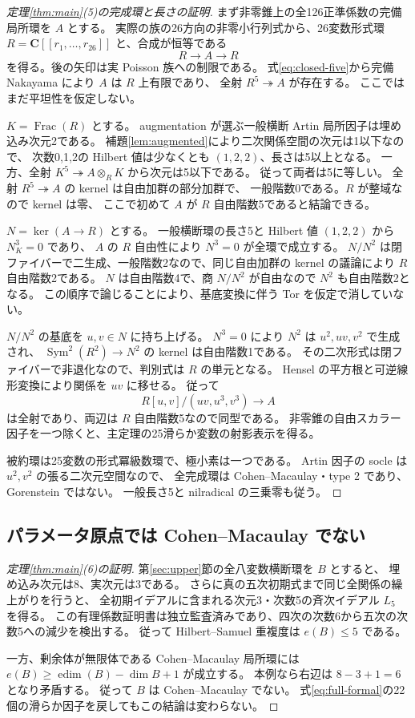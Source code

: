 \documentclass[11pt,a4paper]{ltjsarticle}
\newcommand{\CC}{\mathbf C}
\newcommand{\Sym}{\operatorname{Sym}}
\theoremstyle{remark}
\begin{document}
\begin{proof}[定理\ref{thm:main}(5)の完成環と長さの証明]
まず非零錐上の全126正準係数の完備局所環を $A$ とする。
実際の族の26方向の非零小行列式から、26変数形式環
$R=\CC[[r_1,\ldots,r_{26}]]$ と、合成が恒等である
\[
 R\longrightarrow A\longrightarrow R
\]
を得る。後の矢印は実 Poisson 族への制限である。
式\eqref{eq:closed-five}から完備 Nakayama により $A$ は $R$ 上有限であり、
全射 $R^5\twoheadrightarrow A$ が存在する。
ここではまだ平坦性を仮定しない。

$K=\operatorname{Frac}(R)$ とする。
augmentation が選ぶ一般横断 Artin 局所因子は埋め込み次元2である。
補題\ref{lem:augmented}により二次関係空間の次元は1以下なので、
次数0,1,2の Hilbert 値は少なくとも $(1,2,2)$、長さは5以上となる。
一方、全射 $K^5\twoheadrightarrow A\otimes_RK$ から次元は5以下である。
従って両者は5に等しい。
全射 $R^5\twoheadrightarrow A$ の kernel は自由加群の部分加群で、
一般階数0である。$R$ が整域なので kernel は零、
ここで初めて $A$ が $R$ 自由階数5であると結論できる。

$N=\ker(A\to R)$ とする。
一般横断環の長さ5と Hilbert 値 $(1,2,2)$ から $N_K^3=0$ であり、
$A$ の $R$ 自由性により $N^3=0$ が全環で成立する。
$N/N^2$ は閉ファイバーで二生成、一般階数2なので、同じ自由加群の kernel の議論により
$R$ 自由階数2である。
$N$ は自由階数4で、商 $N/N^2$ が自由なので $N^2$ も自由階数2となる。
この順序で論じることにより、基底変換に伴う Tor を仮定で消していない。

$N/N^2$ の基底を $u,v\in N$ に持ち上げる。
$N^3=0$ により $N^2$ は $u^2,uv,v^2$ で生成され、
$\Sym^2(R^2)\to N^2$ の kernel は自由階数1である。
その二次形式は閉ファイバーで非退化なので、判別式は $R$ の単元となる。
Hensel の平方根と可逆線形変換により関係を $uv$ に移せる。
従って
\[
 R[u,v]/(uv,u^3,v^3)\longrightarrow A
\]
は全射であり、両辺は $R$ 自由階数5なので同型である。
非零錐の自由スカラー因子を一つ除くと、主定理の25滑らか変数の射影表示を得る。

被約環は25変数の形式冪級数環で、極小素は一つである。
Artin 因子の socle は $u^2,v^2$ の張る二次元空間なので、
全完成環は Cohen--Macaulay・type 2 であり、Gorenstein ではない。
一般長さ5と nilradical の三乗零も従う。
\end{proof}

\subsection{パラメータ原点では Cohen--Macaulay でない}

\begin{proof}[定理\ref{thm:main}(6)の証明]
第\ref{sec:upper}節の全八変数横断環を $B$ とすると、
埋め込み次元は8、実次元は3である。
さらに真の五次初期式まで同じ全関係の繰上がりを行うと、
全初期イデアルに含まれる次元3・次数5の斉次イデアル $L_5$ を得る。
この有理係数証明書は独立監査済みであり、四次の次数6から五次の次数5への減少を検出する。
従って Hilbert--Samuel 重複度は $e(B)\le5$ である。

一方、剰余体が無限体である Cohen--Macaulay 局所環には
$e(B)\ge\operatorname{edim}(B)-\dim B+1$ が成立する。
本例なら右辺は $8-3+1=6$ となり矛盾する。
従って $B$ は Cohen--Macaulay でない。
式\eqref{eq:full-formal}の22個の滑らか因子を戻してもこの結論は変わらない。
\end{proof}
\end{document}
